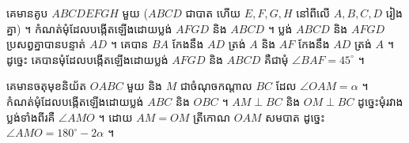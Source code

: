\begin{example}[លំហាត់គំរូ]
គេមានគូប $ABCDEFGH$ មួយ ($ABCD$ ជាបាត ហើយ $E, F, G, H$ នៅពីលើ $A, B, C, D$ រៀងគ្នា) ។ កំណត់មុំដែលបង្កើតឡើងដោយប្លង់ $AFGD$ និង $ABCD$ ។
\ans
ប្លង់ $ABCD$ និង $AFGD$ ប្រសព្វគ្នាបានបន្ទាត់ $AD$ ។ គេបាន $BA$ កែងនឹង $AD$ ត្រង់ $A$ និង $AF$ កែងនឹង $AD$ ត្រង់ $A$ ។ ដូច្នេះ គេបានមុំដែលបង្កើតឡើងដោយប្លង់ $AFGD$ និង $ABCD$ គឺជាមុំ $\angle BAF = 45^\circ$ ។
\end{example}

\begin{pro}
គេមានចតុមុខនិយ័ត $OABC$ មួយ និង $M$ ជាចំណុចកណ្ដាល $BC$ ដែល $\angle OAM = \alpha$ ។ កំណត់មុំដែលបង្កើតឡើងដោយប្លង់ $ABC$ និង $OBC$ ។
\ans
$AM \perp BC$ និង $OM \perp BC$ ដូច្នេះមុំរវាងប្លង់ទាំងពីរគឺ $\angle AMO$ ។ ដោយ $AM = OM$ ត្រីកោណ $OAM$ សមបាត ដូច្នេះ $\angle AMO = 180^\circ - 2\alpha$ ។
\end{pro}


